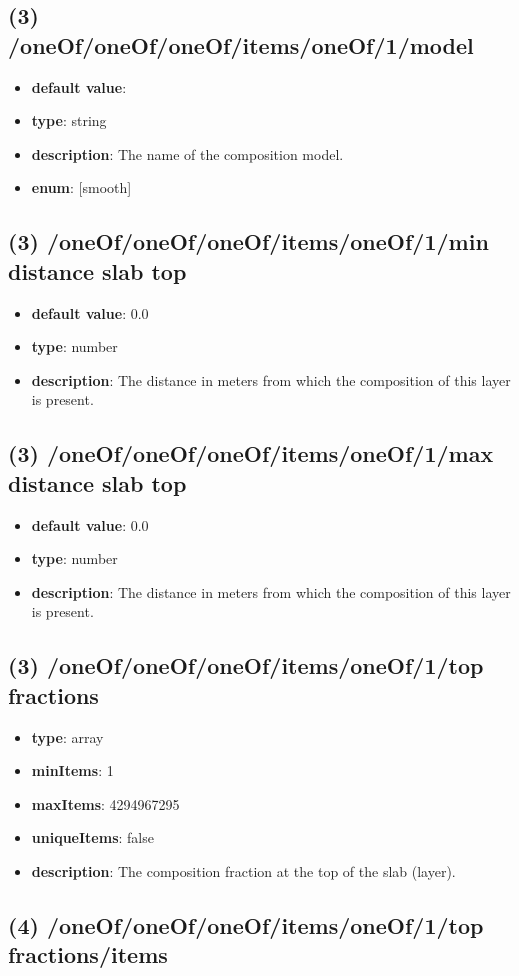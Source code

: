 \subsection{(3) /oneOf/oneOf/oneOf/items/oneOf/1/model}
\begin{itemize}[leftmargin=3em]\item {\bf default value}: 
\item {\bf type}: string
\item {\bf description}: The name of the composition model.
\item {\bf enum}: [smooth]\end{itemize}\subsection{(3) /oneOf/oneOf/oneOf/items/oneOf/1/min distance slab top}
\begin{itemize}[leftmargin=3em]\item {\bf default value}: 0.0
\item {\bf type}: number
\item {\bf description}: The distance in meters from which the composition of this layer is present.
\end{itemize}\subsection{(3) /oneOf/oneOf/oneOf/items/oneOf/1/max distance slab top}
\begin{itemize}[leftmargin=3em]\item {\bf default value}: 0.0
\item {\bf type}: number
\item {\bf description}: The distance in meters from which the composition of this layer is present.
\end{itemize}\subsection{(3) /oneOf/oneOf/oneOf/items/oneOf/1/top fractions}
\begin{itemize}[leftmargin=3em]\item {\bf type}: array
\item {\bf minItems}: 1
\item {\bf maxItems}: 4294967295
\item {\bf uniqueItems}: false
\item {\bf description}: The composition fraction at the top of the slab (layer).
\end{itemize}\subsection{(4) /oneOf/oneOf/oneOf/items/oneOf/1/top fractions/items}
